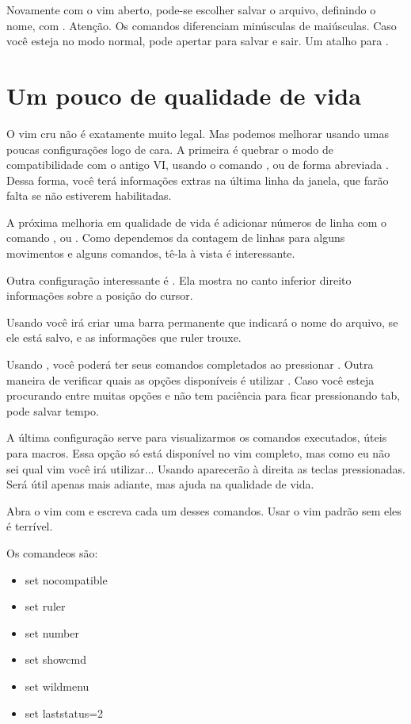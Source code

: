 Novamente com o vim aberto, pode-se escolher salvar o arquivo, definindo o nome, com .
Atenção. Os comandos diferenciam minúsculas de maiúsculas.
Caso você esteja no modo normal, pode apertar  para salvar e sair. Um atalho para .

\section{Um pouco de qualidade de vida}
O vim cru não é exatamente muito legal.
Mas podemos melhorar usando umas poucas configurações logo de cara.
A primeira é quebrar o modo de compatibilidade com o antigo VI, usando o comando ,
ou de forma abreviada .
Dessa forma, você terá informações extras na última linha da janela, que farão falta se não estiverem habilitadas.

A próxima melhoria em qualidade de vida é adicionar números de linha com o comando , ou .
Como dependemos da contagem de linhas para alguns movimentos e alguns comandos, tê-la à vista é interessante.

Outra configuração interessante é .
Ela mostra no canto inferior direito informações sobre a posição do cursor.

Usando  você irá criar uma barra permanente que indicará o nome do arquivo,
se ele está salvo, e as informações que ruler trouxe.

Usando , você poderá ter seus comandos completados ao pressionar .
Outra maneira de verificar quais as opções disponíveis é utilizar .
Caso você esteja procurando entre muitas opções e não tem paciência para ficar pressionando tab,
 pode salvar tempo.

A última configuração serve para visualizarmos os comandos executados, úteis para macros.
Essa opção só está disponível no vim completo, mas como eu não sei qual vim você irá utilizar...
Usando  aparecerão à direita as teclas pressionadas.
Será útil apenas mais adiante, mas ajuda na qualidade de vida.

Abra o vim com  e escreva cada um desses comandos.
Usar o vim padrão sem eles é terrível.

Os comandeos são:
\begin{itemize}
    \item set nocompatible
    \item set ruler
    \item set number
    \item set showcmd
    \item set wildmenu
    \item set laststatus=2
\end{itemize}


